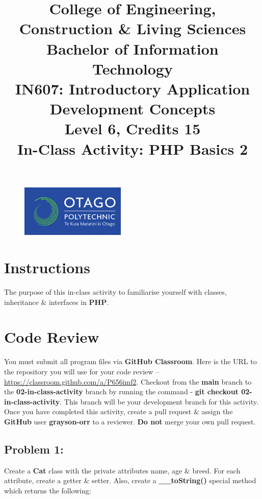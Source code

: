 \documentclass{article}
\author{}
\begin{document}
\begin{figure}
    \centering
    \includegraphics[width=50mm]{../img/logo.png}
\end{figure}

\title{College of Engineering, Construction \& Living Sciences\\Bachelor of Information Technology\\IN607: Introductory Application Development Concepts\\Level 6, Credits 15\\\textbf{In-Class Activity: PHP Basics 2}}
\date{}
\maketitle
 
\section*{Instructions}
The purpose of this in-class activity to familiarise yourself with classes, inheritance \& interfaces in \textbf{PHP}.

\section*{Code Review}
You must submit all program files via \textbf{GitHub Classroom}. Here is the URL to the repository you will use for your code review – \href{https://classroom.github.com/a/P656imf2}{https://classroom.github.com/a/P656imf2}. Checkout from the \textbf{main} branch to the \textbf{02-in-class-activity} branch by running the command - \textbf{git checkout 02-in-class-activity}. This branch will be your development branch for this activity. Once you have completed this activity, create a pull request \& assign the \textbf{GitHub} user \textbf{grayson-orr} to a reviewer. \textbf{Do not} merge your own pull request.

\subsection*{Problem 1:} 
Create a \textbf{Cat} class with the private attributes name, age \& breed. For each attribute, create a getter \& setter. Also, create a \textbf{\_\_toString()} special method which returns the following:
\end{document}
